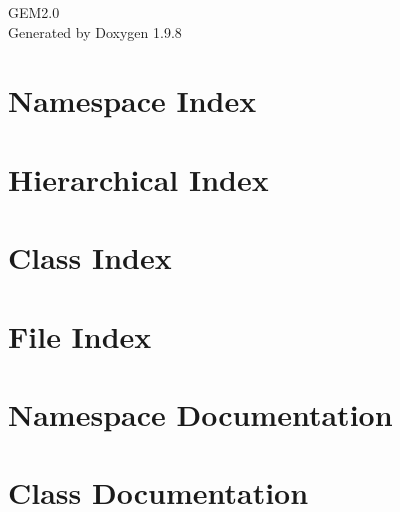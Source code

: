 \documentclass[twoside]{book}
\newcommand{\+}{\discretionary{\mbox{\scriptsize$\hookleftarrow$}}{}{}}
\newcommand{\clearemptydoublepage}{%
    \newpage{\pagestyle{empty}\cleardoublepage}%
  }
\begin{document}
  \raggedbottom
    \hypersetup{pageanchor=false,
                bookmarksnumbered=true,
                pdfencoding=unicode
               }
  \begin{titlepage}
  \vspace*{7cm}
  \begin{center}%
  {\Large GEM2.\+0}\\
  \vspace*{1cm}
  {\large Generated by Doxygen 1.9.8}\\
  \end{center}
  \end{titlepage}
  \clearemptydoublepage
  \tableofcontents
  \clearemptydoublepage
  \hypersetup{pageanchor=true}

\chapter{Namespace Index}

\chapter{Hierarchical Index}

\chapter{Class Index}

\chapter{File Index}

\chapter{Namespace Documentation}



\chapter{Class Documentation}





















\end{document}

